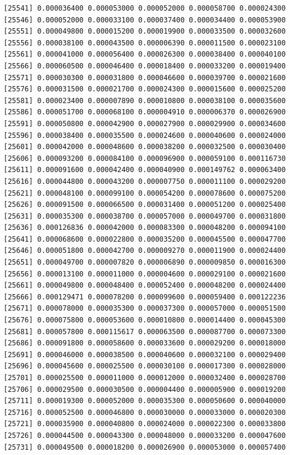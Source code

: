 \documentclass[]{article}
\begin{document}
\begin{verbatim}
[25541] 0.000036400 0.000053000 0.000052000 0.000058700 0.000024300
[25546] 0.000052000 0.000033100 0.000037400 0.000034400 0.000053900
[25551] 0.000049800 0.000015200 0.000019900 0.000033500 0.000032600
[25556] 0.000038100 0.000043500 0.000006390 0.000011500 0.000023100
[25561] 0.000041000 0.000056400 0.000026300 0.000038400 0.000040100
[25566] 0.000060500 0.000046400 0.000018400 0.000033200 0.000019400
[25571] 0.000030300 0.000031800 0.000046600 0.000039700 0.000021600
[25576] 0.000031500 0.000021700 0.000024300 0.000015600 0.000025200
[25581] 0.000023400 0.000007890 0.000010800 0.000038100 0.000035600
[25586] 0.000051700 0.000068100 0.000004910 0.000006370 0.000026900
[25591] 0.000050800 0.000042900 0.000027900 0.000029900 0.000034600
[25596] 0.000038400 0.000035500 0.000024600 0.000040600 0.000024000
[25601] 0.000042000 0.000048600 0.000038200 0.000032500 0.000030400
[25606] 0.000093200 0.000084100 0.000096900 0.000059100 0.000116730
[25611] 0.000091600 0.000042400 0.000040900 0.000149762 0.000063400
[25616] 0.000044800 0.000043200 0.000007750 0.000011100 0.000029200
[25621] 0.000048100 0.000099100 0.000054200 0.000078600 0.000075200
[25626] 0.000091500 0.000066500 0.000031400 0.000051200 0.000025400
[25631] 0.000035300 0.000038700 0.000057000 0.000049700 0.000031800
[25636] 0.000126836 0.000042000 0.000083300 0.000048200 0.000094100
[25641] 0.000068600 0.000022800 0.000035200 0.000045500 0.000047700
[25646] 0.000051800 0.000042700 0.000009270 0.000011900 0.000024400
[25651] 0.000049700 0.000007820 0.000006890 0.000009850 0.000016300
[25656] 0.000013100 0.000011000 0.000004600 0.000029100 0.000021600
[25661] 0.000049800 0.000048400 0.000052400 0.000048200 0.000024400
[25666] 0.000129471 0.000078200 0.000099600 0.000059400 0.000122236
[25671] 0.000078000 0.000035300 0.000037300 0.000057000 0.000051500
[25676] 0.000075800 0.000053600 0.000010800 0.000014400 0.000045300
[25681] 0.000057800 0.000115617 0.000063500 0.000087700 0.000073300
[25686] 0.000091800 0.000058600 0.000033600 0.000029200 0.000018000
[25691] 0.000046000 0.000038500 0.000040600 0.000032100 0.000029400
[25696] 0.000045600 0.000025500 0.000030100 0.000017300 0.000028000
[25701] 0.000025500 0.000011000 0.000012000 0.000032400 0.000028700
[25706] 0.000029500 0.000030500 0.000004400 0.000005900 0.000019200
[25711] 0.000019300 0.000052000 0.000035300 0.000050600 0.000040000
[25716] 0.000052500 0.000046800 0.000030000 0.000033000 0.000020300
[25721] 0.000035900 0.000040800 0.000024000 0.000022300 0.000033800
[25726] 0.000044500 0.000043300 0.000048000 0.000033200 0.000047600
[25731] 0.000049500 0.000018200 0.000026900 0.000053000 0.000057400

\end{verbatim}
\end{document}
